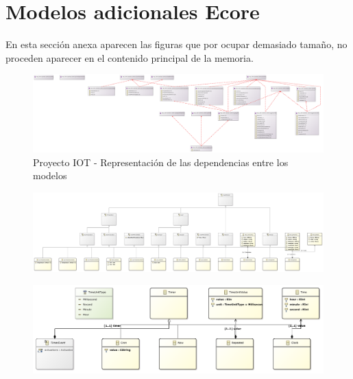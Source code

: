 \appendix

\chapter{Modelos adicionales Ecore}
\label{appendix:modelos_ecore_tree}

En esta sección anexa aparecen las figuras que por ocupar demasiado tamaño, no proceden aparecer en el contenido principal de la memoria.

\begin{landscape}

\begin{figure}
	\centering
    \includegraphics[width=\textwidth]{images/models/iotproyects_package_dependencies.pdf}
    \sourcepropia{}
    \caption{Proyecto IOT - Representación de las dependencias entre los modelos}
    \label{fig:modelo_iotpackages}
\end{figure}

\begin{figure}
\centering
    \includegraphics[width=\textwidth]{images/models/healthmonitors_class_diagram.pdf}
	\label{fig:modelo_iot_health_classes}
\end{figure}

\begin{figure}
	\centering
    \includegraphics[width=\textwidth]{images/models/timers_class_diagram.pdf}
    \label{fig:modelo_timers_classes}
\end{figure}

\end{landscape}



